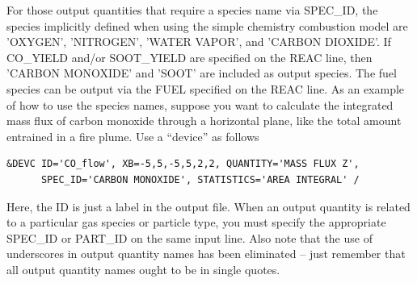 \documentclass[11pt]{book}
\begin{document}
For those output quantities that require a species name via {\ct SPEC\_ID}, the species implicitly defined when using the simple chemistry combustion model are {\ct 'OXYGEN'}, {\ct 'NITROGEN'}, {\ct 'WATER VAPOR'}, and {\ct 'CARBON DIOXIDE'}. If {\ct CO\_YIELD} and/or {\ct SOOT\_YIELD} are specified on the {\ct REAC} line, then {\ct 'CARBON MONOXIDE'} and {\ct 'SOOT'} are included as output species. The fuel species can be output via the {\ct FUEL} specified on the {\ct REAC} line. As an example of how to use the species names, suppose you want to calculate the integrated mass flux of carbon monoxide through a horizontal plane, like the total amount entrained in a fire plume. Use a ``device'' as follows
\begin{lstlisting}
&DEVC ID='CO_flow', XB=-5,5,-5,5,2,2, QUANTITY='MASS FLUX Z',
      SPEC_ID='CARBON MONOXIDE', STATISTICS='AREA INTEGRAL' /
\end{lstlisting}
Here, the {\ct ID} is just a label in the output file. When an output quantity is related to a particular gas species or particle type, you must specify the appropriate {\ct SPEC\_ID} or {\ct PART\_ID} on the same input line. Also note that the use of underscores in output quantity names has been eliminated -- just remember that all output quantity names ought to be in single quotes.


\clearpage
\end{document}
